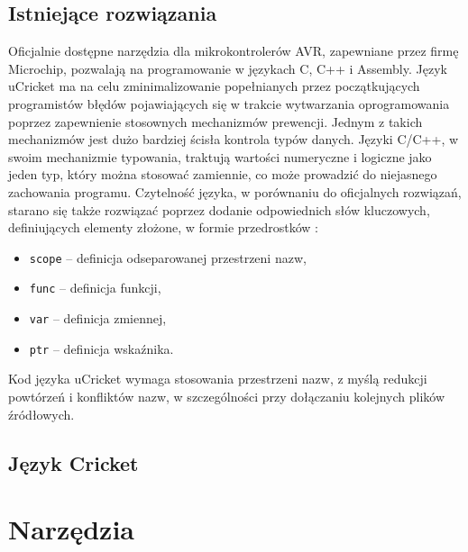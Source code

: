 \subsection{Istniejące rozwiązania}
Oficjalnie dostępne narzędzia dla mikrokontrolerów AVR, zapewniane przez firmę Microchip, pozwalają na programowanie w językach C, C++ i Assembly. Język uCricket ma na celu zminimalizowanie popełnianych przez początkujących programistów błędów pojawiających się w trakcie wytwarzania oprogramowania poprzez zapewnienie stosownych mechanizmów prewencji. Jednym z takich mechanizmów jest dużo bardziej ścisła kontrola typów danych. Języki C/C++, w swoim  mechanizmie typowania, traktują wartości numeryczne i logiczne jako jeden typ, który można stosować zamiennie, co może prowadzić do niejasnego zachowania programu. 
Czytelność języka, w porównaniu do oficjalnych rozwiązań, starano się także rozwiązać poprzez dodanie odpowiednich słów kluczowych, definiujących elementy złożone, w formie przedrostków :
\begin{itemize}
\item \lstinline|scope| -- definicja odseparowanej przestrzeni nazw,
\item \lstinline|func| -- definicja funkcji,
\item \lstinline|var| -- definicja zmiennej,
\item \lstinline|ptr| -- definicja wskaźnika.
\end{itemize}
Kod języka uCricket wymaga stosowania przestrzeni nazw, z myślą redukcji powtórzeń i konfliktów nazw, w szczególności przy dołączaniu kolejnych plików źródłowych.

\subsection{Język \textmu Cricket}





\section{Narzędzia}

